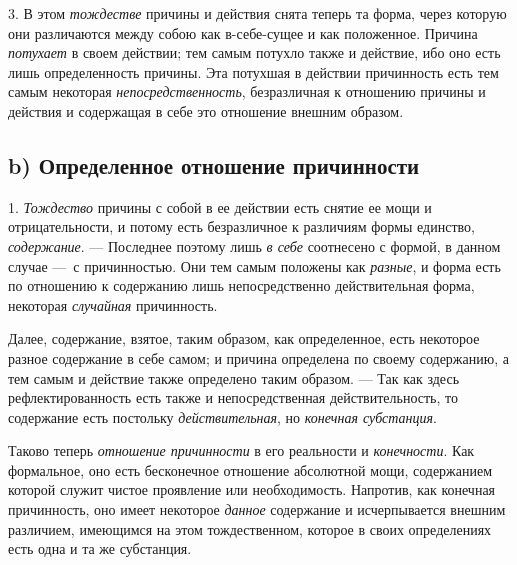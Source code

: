 3. В этом {\em тождестве} причины и действия снята
теперь та форма, через которую они различаются между собою как в-себе-сущее
и как положенное. Причина {\em потухает} в своем
действии; тем самым потухло также и действие, ибо оно есть лишь
определенность причины. Эта потухшая в действии причинность есть тем самым
некоторая {\em непосредственность}, безразличная к
отношению причины и действия и содержащая в себе это отношение внешним
образом.


\subsection[b) Определенное отношение причинности]{b) Определенное отношение причинности}

1. {\em Тождество} причины с
собой в ее действии есть снятие ее мощи и отрицательности, и потому есть
безразличное к различиям формы единство,
{\em содержание}. — Последнее поэтому лишь
{\em в себе} соотнесено с формой, в данном случае —~с
причинностью. Они тем самым положены как {\em разные},
и форма есть по отношению к содержанию лишь непосредственно действительная
форма, некоторая {\em случайная} причинность.

Далее, содержание, взятое, таким образом, как определенное, есть некоторое
разное содержание в себе самом; и причина определена по своему содержанию,
а тем самым и действие также определено таким образом. — Так как здесь
рефлектированность есть также и непосредственная действительность, то
содержание есть постольку {\em действительная}, но
{\em конечная субстанция}.

Таково теперь {\em отношение причинности} в его
реальности и {\em конечности}. Как формальное, оно есть
бесконечное отношение абсолютной мощи, содержанием которой служит чистое
проявление или необходимость. Напротив, как конечная причинность, оно имеет
некоторое {\em данное} содержание и исчерпывается
внешним различием, имеющимся на этом тождественном, которое в своих
определениях есть одна и та же субстанция.

